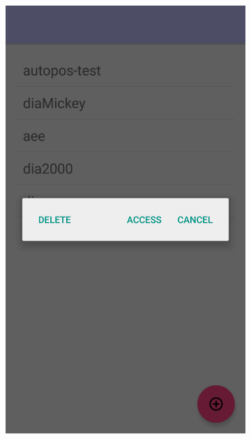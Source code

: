 \begin{figure}[!h]
\begin{subfigure}[t]{.3\textwidth}
				\includegraphics[width=\textwidth]{img/screen/colladia_workspaces_select}
			\end{subfigure}
			~
			\begin{subfigure}[t]{.3\textwidth}

\end{subfigure}
\end{figure}
